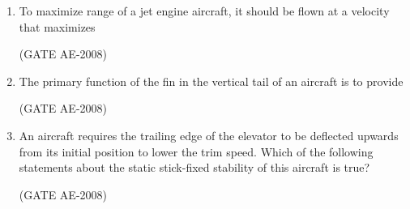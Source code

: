 \documentclass[journal,12pt,onecolumn]{IEEEtran}
\theoremstyle{remark}
\begin{document}
\begin{enumerate}
    \quad

\item To maximize range of a jet engine aircraft, it should be flown at a velocity that maximizes  
\begin{enumerate}
\end{enumerate}
    \hfill(GATE AE-2008)

    \quad

\item The primary function of the fin in the vertical tail of an aircraft is to provide  
\begin{enumerate}
\end{enumerate}
    \hfill(GATE AE-2008)

    \quad

\item An aircraft requires the trailing edge of the elevator to be deflected upwards from its initial position to lower the trim speed. Which of the following statements about the static stick-fixed stability of this aircraft is true? 
\begin{enumerate}
\end{enumerate}
    \hfill(GATE AE-2008)

    \quad


\end{enumerate}
\end{document}
